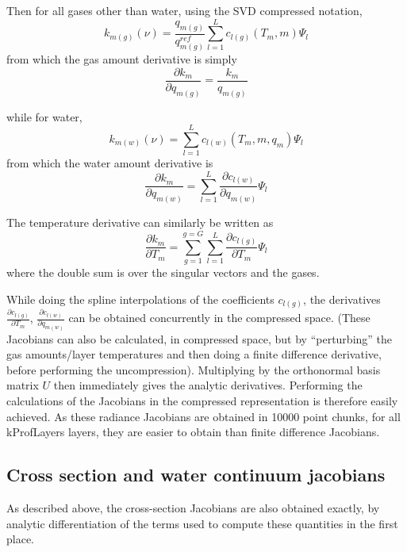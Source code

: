 \documentclass[12pt]{article}
\begin{document}
{{{{Then for all gases other than water, using the SVD compressed notation,
\begin{equation}
k_{m(g)}(\nu) = \frac{q_{m(g)}}{q^{ref}_{m(g)}}
                \sum_{l=1}^{L} c_{l(g)}(T_{m},m) \Psi_{l}
\end{equation}
from which the gas amount derivative is simply 
\begin{equation}
\frac{\partial k_{m}}{\partial q_{m(g)}} = \frac{k_{m}}{q_{m(g)}}
\end{equation}

while for water, 
\begin{equation}
k_{m(w)}(\nu) = \sum_{l=1}^{L} c_{l(w)}(T_{m},m,q_{m}) \Psi_{l}
\end{equation}
from which the water amount derivative is 
\begin{equation}
\frac{\partial k_{m}}{\partial q_{m(w)}} = 
\sum_{l=1}^{L} \frac{\partial c_{l(w)}}{\partial q_{m(w)}} \Psi_{l}
\end{equation}

The temperature derivative can similarly be written as
\begin{equation}
\frac{\partial k_{m}}{\partial T_{m}} = 
\sum_{g=1}^{g=G} \sum_{l=1}^{L} 
\frac{\partial c_{l(g)}}{\partial T_{m}} \Psi_{l}
\end{equation}
where the double sum is over the singular vectors and the gases.

While doing the spline interpolations of the coefficients $c_{l(g)}$,
the derivatives $\frac{\partial c_{l(g)}}{\partial T_{m}}$,
$\frac{\partial c_{l(w)}}{\partial q_{m(w)}}$ can be obtained
concurrently \cite{wil:89*2} in the compressed space.   (These
Jacobians can also be calculated, in compressed space, but by
``perturbing'' the gas amounts/layer temperatures and then doing a
finite difference derivative, before performing the uncompression).
Multiplying by the orthonormal basis matrix $U$ then immediately gives
the analytic derivatives.   Performing the calculations of the
Jacobians in the compressed representation is therefore easily
achieved.  As these radiance Jacobians are obtained in 10000 point chunks,
for all kProfLayers layers, they are easier to obtain than finite difference
Jacobians.  

\subsection{Cross section and water continuum jacobians}
As described above, the cross-section Jacobians are also obtained exactly, by 
analytic differentiation of the terms used to compute these quantities in the 
first place.

}}}}
\end{document}
